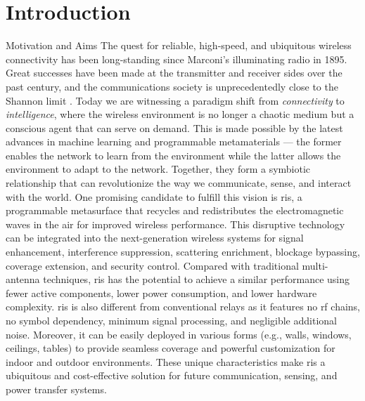 
\graphicspath{{assets/chapter_1/}}

\chapter{Introduction}

\begin{section}{Motivation and Aims}
	The quest for reliable, high-speed, and ubiquitous wireless connectivity has been long-standing since Marconi's illuminating radio in 1895.
	Great successes have been made at the transmitter and receiver sides over the past century, and the communications society is unprecedentedly close to the Shannon limit \cite{Shannon1948}.
	Today we are witnessing a paradigm shift from \emph{connectivity} to \emph{intelligence}, where the wireless environment is no longer a chaotic medium but a conscious agent that can serve on demand.
	This is made possible by the latest advances in machine learning and programmable metamaterials --- the former enables the network to learn from the environment while the latter allows the environment to adapt to the network.
	Together, they form a symbiotic relationship that can revolutionize the way we communicate, sense, and interact with the world.
	One promising candidate to fulfill this vision is \gls{ris}, a programmable metasurface that recycles and redistributes the electromagnetic waves in the air for improved wireless performance.
	This disruptive technology can be integrated into the next-generation wireless systems for signal enhancement, interference suppression, scattering enrichment, blockage bypassing, coverage extension, and security control.
	Compared with traditional multi-antenna techniques, \gls{ris} has the potential to achieve a similar performance using fewer active components, lower power consumption, and lower hardware complexity.
	\gls{ris} is also different from conventional relays as it features no \gls{rf} chains, no symbol dependency, minimum signal processing, and negligible additional noise.
	Moreover, it can be easily deployed in various forms (e.g., walls, windows, ceilings, tables) to provide seamless coverage and powerful customization for indoor and outdoor environments.
	These unique characteristics make \gls{ris} a ubiquitous and cost-effective solution for future communication, sensing, and power transfer systems.


\end{section}
